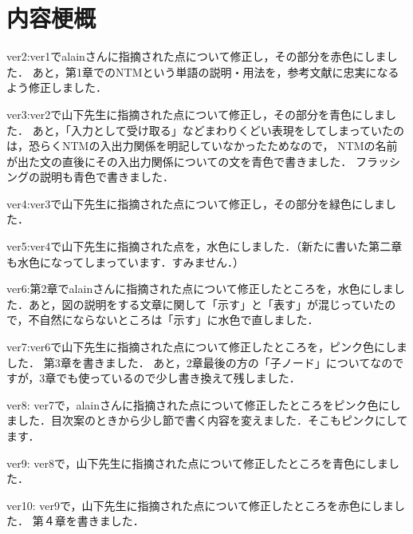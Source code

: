 \chapter*{内容梗概}
ver2:ver1でalainさんに指摘された点について修正し，その部分を赤色にしました．
あと，第1章でのNTMという単語の説明・用法を，参考文献に忠実になるよう修正しました．

ver3:ver2で山下先生に指摘された点について修正し，その部分を青色にしました．
あと，「入力として受け取る」などまわりくどい表現をしてしまっていたのは，恐らくNTMの入出力関係を明記していなかったためなので，
NTMの名前が出た文の直後にその入出力関係についての文を青色で書きました．
フラッシングの説明も青色で書きました．

ver4:ver3で山下先生に指摘された点について修正し，その部分を緑色にしました．

ver5:ver4で山下先生に指摘された点を，水色にしました．（新たに書いた第二章も水色になってしまっています．すみません．）

ver6:第2章でalainさんに指摘された点について修正したところを，水色にしました．あと，図の説明をする文章に関して「示す」と「表す」が混じっていたので，不自然にならないところは「示す」に水色で直しました．

ver7:ver6で山下先生に指摘された点について修正したところを，ピンク色にしました．
第3章を書きました．
あと，2章最後の方の「子ノード」についてなのですが，3章でも使っているので少し書き換えて残しました．

ver8:
ver7で，alainさんに指摘された点について修正したところをピンク色にしました．目次案のときから少し節で書く内容を変えました．そこもピンクにしてます．

ver9:
ver8で，山下先生に指摘された点について修正したところを青色にしました．

ver10: 
ver9で，山下先生に指摘された点について修正したところを赤色にしました．
第４章を書きました．
